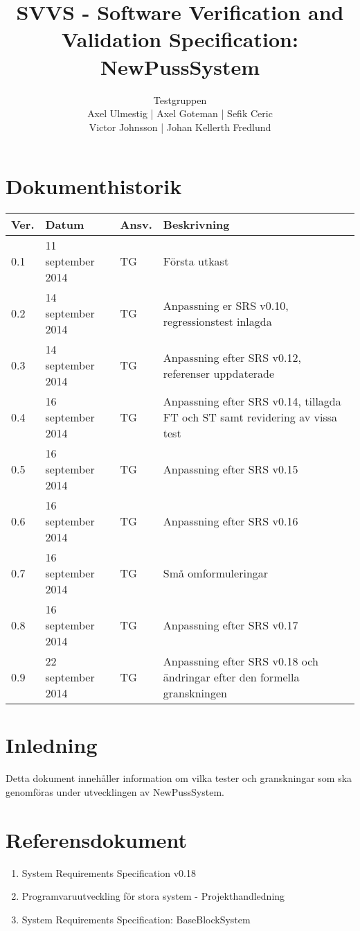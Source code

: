 \documentclass[a4paper]{article}
\title{SVVS - Software Verification and Validation Specification: NewPussSystem}
\author{Testgruppen \\ Axel Ulmestig | Axel Goteman | Sefik Ceric \\ Victor Johnsson | Johan Kellerth Fredlund}
\date{}
\begin{document}
\maketitle
\thispagestyle{fancy}
\tableofcontents
\newpage

\section*{Dokumenthistorik}

\begin{tabular}{ l l l p{9cm} }
Ver. & Datum & Ansv. & Beskrivning \\\hline
0.1 & 11 september 2014 & TG & Första utkast \\
0.2 & 14 september 2014 & TG & Anpassning er SRS v0.10, regressionstest inlagda \\
0.3 & 14 september 2014 & TG & Anpassning efter SRS v0.12, referenser uppdaterade\\
0.4 & 16 september 2014 & TG & Anpassning efter SRS v0.14, tillagda FT och ST samt revidering av vissa test\\
0.5 & 16 september 2014 & TG & Anpassning efter SRS v0.15\\
0.6 & 16 september 2014 & TG & Anpassning efter SRS v0.16\\
0.7 & 16 september 2014 & TG & Små omformuleringar \\
0.8 & 16 september 2014 & TG & Anpassning efter SRS v0.17\\
0.9 & 22 september 2014 & TG & Anpassning efter SRS v0.18 och ändringar efter den formella granskningen \\

\end{tabular}
\section{Inledning}       

Detta dokument innehåller information om vilka tester och granskningar som ska genomföras under utvecklingen av NewPussSystem.

\section{Referensdokument}
\begin{enumerate}
\item System Requirements Specification v0.18
\item Programvaruutveckling för stora system - Projekthandledning
\item System Requirements Specification: BaseBlockSystem
\end{enumerate}
\end{document}

